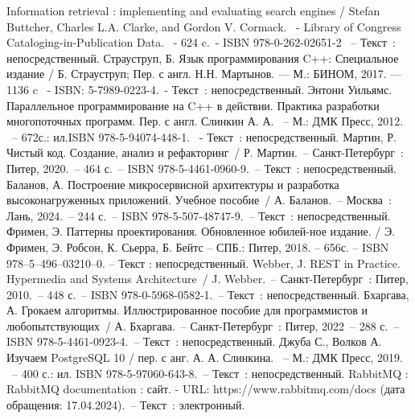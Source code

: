 
\begin{thebibliography}{10}
	 Information retrieval : implementing and evaluating search engines / Stefan Buttcher, Charles L.A. Clarke, and Gordon V. Cormack. ~- Library of Congress Cataloging-in-Publication Data. ~- 624 c.~- ISBN 978-0-262-02651-2 ~– Текст~: непосредственный.
	 Страуструп, Б. Язык программирования C++: Специальное издание / Б. Страуструп; Пер. с англ. Н.Н. Мартынов. — М.: БИНОМ, 2017. — 1136 c ~- ISBN: 5-7989-0223-4.~- Текст~: непосредственный.
	 Энтони Уильямс. Параллельное программирование на C++ в действии. Практика разработки многопоточных программ. Пер. с англ. Слинкин А. А. ~– М.: ДМК Пресс, 2012. ~– 672с.: ил.ISBN 978-5-94074-448-1. ~- Текст~: непосредственный.
		Мартин, Р. Чистый код. Создание, анализ и рефакторинг~/ Р. Мартин.~– Санкт-Петербург~: Питер, 2020.~– 464 с.~– ISBN 978-5-4461-0960-9.~– Текст~: непосредственный.
     Баланов, А. Построение микросервисной архитектуры и разработка высоконагруженных приложений. Учебное пособие~/ А. Баланов.~– Москва~: Лань, 2024.~– 244 с.~– ISBN 978-5-507-48747-9.~– Текст~: непосредственный.
	 Фримен, Э. Паттерны проектирования. Обновленное юбилей-ное издание. / Э. Фримен, Э. Робсон, К. Сьерра, Б. Бейтс – СПБ.: Питер, 2018. – 656с. – ISBN 978–5–496–03210–0. – Текст : непосредственный.
		Webber, J. REST in Practice. Hypermedia and Systems Architecture~/ J. Webber.~– Санкт-Петербург~: Питер, 2010.~– 448 с.~– ISBN 978-0-5968-0582-1.~– Текст~: непосредственный.
	 Бхаргава, А. Грокаем алгоритмы. Иллюстрированное пособие для программистов и любопытствующих~/ А. Бхаргава.~– Санкт-Петербург~: Питер, 2022~– 288 с.~– ISBN 978-5-4461-0923-4.~– Текст~: непосредственный.
	 Джуба С., Волков А. Изучаем PostgreSQL 10 / пер. с анг. А. А. Слинкина. ~– М.: ДМК Пресс, 2019. ~– 400 с.: ил. ISBN 978-5-97060-643-8.~– Текст~: непосредственный.
	 RabbitMQ : RabbitMQ  documentation : сайт. - URL: https://www.rabbitmq.com/docs (дата обращения: 17.04.2024).~– Текст~: электронный.
\end{thebibliography}
